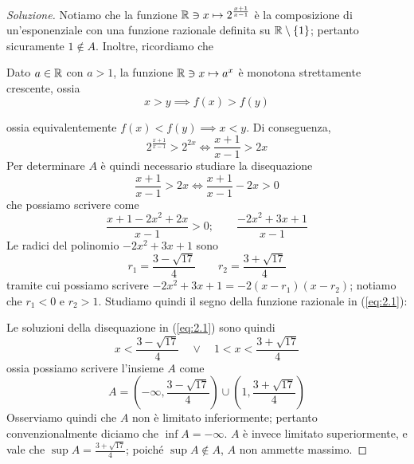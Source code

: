 \begin{proof}[Soluzione]
    Notiamo che la funzione $\amsbb{R}\ni x \mapsto 2^{\frac{x+1}{x-1}}$ è la composizione di un'esponenziale con una funzione razionale definita su $\amsbb{R}\setminus \{1\}$; pertanto sicuramente $1\notin A$. Inoltre, ricordiamo che
    \begin{tcolorbox}
        Dato $a\in\amsbb{R}$ con $a>1$, la funzione $\amsbb{R}\ni x \mapsto a^x$ è monotona strettamente crescente, ossia
        \[
        x > y \implies f(x) > f(y)
        \]
    \end{tcolorbox}
    ossia equivalentemente $f(x)<f(y) \implies x <y$. Di conseguenza,
    \[
    2^{\frac{x+1}{x-1}}>2^{2x} \iff \frac{x+1}{x-1}> 2x
    \]
    Per determinare $A$ è quindi necessario studiare la disequazione
    \[
    \frac{x+1}{x-1}>2x \iff \frac{x+1}{x-1}-2x >0
    \]
    che possiamo scrivere come 
    \begin{equation}
        \label{eq:2.1}
        \frac{x+1-2x^2+2x}{x-1}>0; \qquad \frac{-2x^2+3x+1}{x-1}
    \end{equation}
    Le radici del polinomio $-2x^2+3x+1$ sono
    \[
    r_1 = \frac{3-\sqrt{17}}{4} \qquad r_2 = \frac{3+\sqrt{17}}{4}
    \]
    tramite cui possiamo scrivere $-2x^2+3x+1 = -2(x-r_1)(x-r_2)$; notiamo che $r_1<0$ e $r_2>1$. Studiamo quindi il segno della funzione razionale in (\ref{eq:2.1}):
    \begin{center}
    \end{center}
    Le soluzioni della disequazione in (\ref{eq:2.1}) sono quindi
    \[
    x<\frac{3-\sqrt{17}}{4} \quad \lor \quad  1 < x < \frac{3+\sqrt{17}}{4}
    \]
    ossia possiamo scrivere l'insieme $A$ come
    \[
    A = \left(-\infty, \frac{3-\sqrt{17}}{4}\right)\cup \left(1, \frac{3+\sqrt{17}}{4}\right)
    \]
    Osserviamo quindi che $A$ non è limitato inferiormente; pertanto convenzionalmente diciamo che $\inf A = -\infty$. $A$ è invece limitato superiormente, e vale che $\sup A = \frac{3+\sqrt{17}}{4}$; poiché $\sup A \notin A$, $A$ non ammette massimo.
\end{proof}
